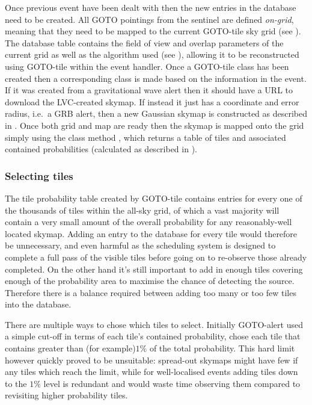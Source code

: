 \begin{colsection}
\begin{colsection}
Once previous event have been dealt with then the new entries in the database need to be created. All GOTO pointings from the sentinel are defined \textit{on-grid}, meaning that they need to be mapped to the current GOTO-tile sky grid (see ). The database  table contains the field of view and overlap parameters of the current grid as well as the algorithm used (see ), allowing it to be reconstructed using GOTO-tile within the event handler. Once a GOTO-tile  class has been created then a corresponding  class is made based on the information in the event. If it was created from a gravitational wave alert then it should have a URL to download the LVC-created skymap. If instead it just has a coordinate and error radius, i.e.\ a GRB alert, then a new Gaussian skymap is constructed as described in . Once both grid and map are ready then the skymap is mapped onto the grid simply using the class method , which returns a table of tiles and associated contained probabilities (calculated as described in ). %

\subsubsection{Selecting tiles}

The tile probability table created by GOTO-tile contains entries for every one of the thousands of tiles within the all-sky grid, of which a vast majority will contain a very small amount of the overall probability for any reasonably-well located skymap. Adding an entry to the database for every tile would therefore be unnecessary, and even harmful as the scheduling system is designed to complete a full pass of the visible tiles before going on to re-observe those already completed. On the other hand it's still important to add in enough tiles covering enough of the probability area to maximise the chance of detecting the source. Therefore there is a balance required between adding too many or too few tiles into the database.

There are multiple ways to chose which tiles to select. Initially GOTO-alert used a simple cut-off in terms of each tile's contained probability, chose each tile that contains greater than (for example)$1\%$ of the total probability. This hard limit however quickly proved to be unsuitable: spread-out skymaps might have few if any tiles which reach the limit, while for well-localised events adding tiles down to the $1\%$ level is redundant and would waste time observing them compared to revisiting higher probability tiles.


\end{colsection}
\end{colsection}
